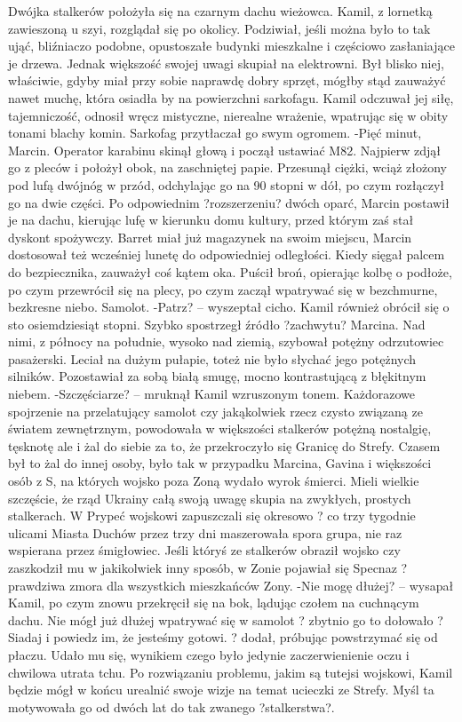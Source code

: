\documentclass[../MAIN.tex]{subfiles}
\begin{document}
Dwójka stalkerów położyła się na czarnym dachu wieżowca.
Kamil, z lornetką zawieszoną u szyi, rozglądał się po okolicy. Podziwiał, jeśli można było to tak ująć, bliźniaczo podobne, opustoszałe budynki mieszkalne i częściowo zasłaniające je drzewa. Jednak większość swojej uwagi skupiał na elektrowni. Był blisko niej, właściwie, gdyby miał przy sobie naprawdę dobry sprzęt, mógłby stąd zauważyć nawet muchę, która osiadła by na powierzchni sarkofagu.
Kamil odczuwał jej siłę, tajemniczość, odnosił wręcz mistyczne, nierealne wrażenie, wpatrując się w obity tonami blachy komin. Sarkofag przytłaczał go swym ogromem.
-Pięć minut, Marcin.
Operator karabinu skinął głową i począł ustawiać M82. Najpierw zdjął go z pleców i położył obok, na zaschniętej papie. Przesunął ciężki, wciąż złożony pod lufą dwójnóg w przód, odchylając go na 90 stopni w dół, po czym rozłączył go na dwie części. Po odpowiednim ?rozszerzeniu? dwóch oparć, Marcin postawił je na dachu, kierując lufę w kierunku domu kultury, przed którym zaś stał dyskont spożywczy.
Barret miał już magazynek na swoim miejscu, Marcin dostosował też wcześniej lunetę do odpowiedniej odległości. Kiedy sięgał palcem do bezpiecznika, zauważył coś kątem oka. Puścił broń, opierając kolbę o podłoże, po czym przewrócił się na plecy, po czym zaczął wpatrywać się w bezchmurne, bezkresne niebo.
Samolot.
-Patrz? -- wyszeptał cicho.
Kamil również obrócił się o sto osiemdziesiąt stopni. Szybko spostrzegł źródło ?zachwytu? Marcina.
Nad nimi, z północy na południe, wysoko nad ziemią, szybował potężny odrzutowiec pasażerski. Leciał na dużym pułapie, toteż nie było słychać jego potężnych silników. Pozostawiał za sobą białą smugę, mocno kontrastującą z błękitnym niebem.
-Szczęściarze? -- mruknął Kamil wzruszonym tonem. Każdorazowe spojrzenie na przelatujący samolot czy jakąkolwiek rzecz czysto związaną ze światem zewnętrznym, powodowała w większości stalkerów potężną nostalgię, tęsknotę ale i żal do siebie za to, że przekroczyło się Granicę do Strefy. Czasem był to żal do innej osoby, było tak w przypadku Marcina, Gavina i większości osób z S, na których wojsko poza Zoną wydało wyrok śmierci. Mieli wielkie szczęście, że rząd Ukrainy całą swoją uwagę skupia na zwykłych, prostych stalkerach. W Prypeć wojskowi zapuszczali się okresowo ? co trzy tygodnie ulicami Miasta Duchów przez trzy dni maszerowała spora grupa, nie raz wspierana przez śmigłowiec. Jeśli któryś ze stalkerów obraził wojsko czy zaszkodził mu w jakikolwiek inny sposób, w Zonie pojawiał się Specnaz ? prawdziwa zmora dla wszystkich mieszkańców Zony.
-Nie mogę dłużej? -- wysapał Kamil, po czym znowu przekręcił się na bok, lądując czołem na cuchnącym dachu. Nie mógł już dłużej wpatrywać się w samolot ? zbytnio go to dołowało ? Siadaj i powiedz im, że jesteśmy gotowi. ? dodał, próbując powstrzymać się od płaczu. Udało mu się, wynikiem czego było jedynie zaczerwienienie oczu i chwilowa utrata tchu.
Po rozwiązaniu problemu, jakim są tutejsi wojskowi, Kamil będzie mógł w końcu urealnić swoje wizje na temat ucieczki ze Strefy. Myśl ta motywowała go od dwóch lat do tak zwanego ?stalkerstwa?.
\end{document}

